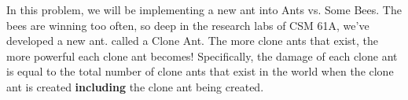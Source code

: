In this problem, we will be implementing a new ant into Ants vs. Some Bees. 
The bees are winning too often, so deep in the research labs of CSM 61A, we've developed a new ant.
called a Clone Ant. The more clone ants that exist, the more powerful each clone ant becomes! Specifically,
the damage of each clone ant is equal to the total number of clone ants that exist in the world when the clone ant is created \textbf{including} the clone ant being created.
